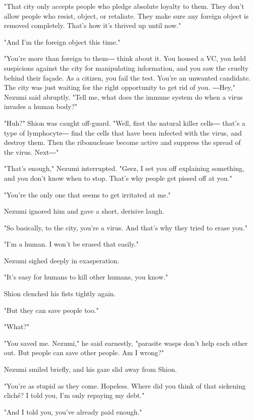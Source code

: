 "That city only accepts people who pledge absolute loyalty to them. They
don't allow people who resist, object, or retaliate. They make sure any
foreign object is removed completely. That's how it's thrived up until
now."

"And I'm the foreign object this time."

"You're more than foreign to them― think about it. You housed a VC, you
held suspicions against the city for manipulating information, and you
saw the cruelty behind their fa\c{c}ade. As a citizen, you fail the test.
You're an unwanted candidate. The city was just waiting for the right
opportunity to get rid of you. ―Hey," Nezumi said abruptly. "Tell me,
what does the immune system do when a virus invades a human body?"

"Huh?" Shion was caught off-guard. "Well, first the natural killer
cells― that's a type of lymphocyte― find the cells that have been
infected with the virus, and destroy them. Then the ribonuclease become
active and suppress the spread of the virus. Next―"

"That's enough," Nezumi interrupted. "Geez, I set you off explaining
something, and you don't know when to stop. That's why people get pissed
off at you."

"You're the only one that seems to get irritated at me."

Nezumi ignored him and gave a short, derisive laugh.

"So basically, to the city, you're a virus. And that's why they tried to
erase you."

"I'm a human. I won't be erased that easily."

Nezumi sighed deeply in exasperation.

"It's easy for humans to kill other humans, you know."

Shion clenched his fists tightly again.

"But they can save people too."

"What?"

"You saved me. Nezumi," he said earnestly, "parasite wasps don't help
each other out. But people can save other people. Am I wrong?"

Nezumi smiled briefly, and his gaze slid away from Shion.

"You're as stupid as they come. Hopeless. Where did you think of that
sickening cliché? I told you, I'm only repaying my debt."

"And I told you, you've already paid enough."

